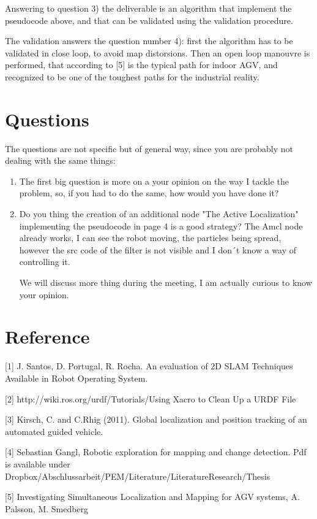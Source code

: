 \documentclass[11pt,a4paper]{article}
\begin{document}
Answering to question 3) the deliverable is an algorithm that implement the pseudocode above, and that can be validated using the validation procedure. 

The validation answers the question number 4): first the algorithm has to be validated in close loop, to avoid map distorsions. Then an open loop manouvre is performed, that according to [5] is the typical path for indoor AGV, and recognized to be one of the toughest paths for the industrial reality. 

\section{Questions}

The questions are not specific but of general way, since you are probably not dealing with the same things: 
\begin{enumerate}
\item The first big question is more on a your opinion on the way I tackle the problem, so, if you had to do the same, how would you have done it?
\item Do you thing the creation of an additional node "The Active Localization" implementing the pseudocode in page 4 is a good strategy? The Amcl node already works, I can see the robot moving, the particles being spread, however the src code of the filter is not visible and I don´t know a way of controlling it.

We will discuss more thing during the meeting, I am actually curious to know your opinion.

\end{enumerate}

\section{Reference}

[1] J. Santos, D. Portugal, R. Rocha. An evaluation of 2D SLAM Techniques Available in Robot Operating System.

[2] http://wiki.ros.org/urdf/Tutorials/Using Xacro to Clean Up a URDF File

[3] Kirsch, C. and C.Rhig (2011). Global localization and position tracking of an automated guided vehicle.

[4] Sebastian Gangl, Robotic exploration for mapping and change detection. Pdf is available under Dropbox/Abschlussarbeit/PEM/Literature/LiteratureResearch/Thesis

[5] Investigating Simultaneous Localization and Mapping for AGV systems, A. Palsson, M. Smedberg
\end{document}
